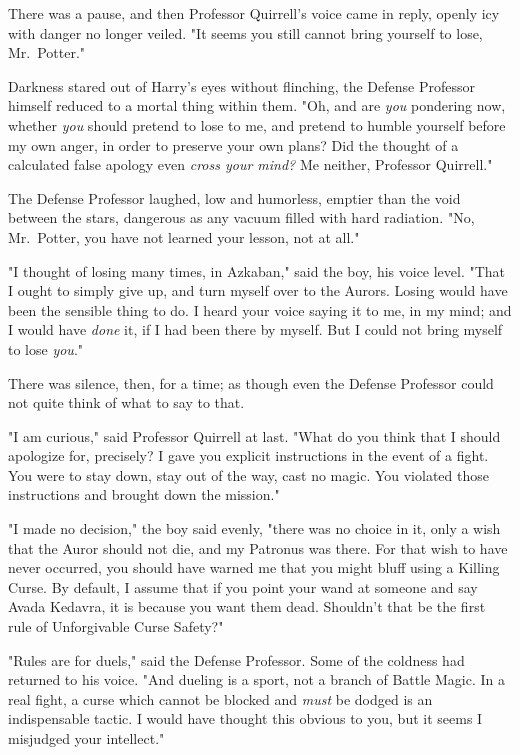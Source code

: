 There was a pause, and then Professor Quirrell's voice came in reply, openly 
icy with danger no longer veiled. "It seems you still cannot bring yourself to 
lose, Mr.~Potter."

Darkness stared out of Harry's eyes without flinching, the Defense Professor 
himself reduced to a mortal thing within them. "Oh, and are \emph{you} 
pondering now, whether \emph{you} should pretend to lose to me, and pretend to 
humble yourself before my own anger, in order to preserve your own plans? Did 
the thought of a calculated false apology even \emph{cross your mind?} Me 
neither, Professor Quirrell."

The Defense Professor laughed, low and humorless, emptier than the void between 
the stars, dangerous as any vacuum filled with hard radiation. "No, Mr.~Potter, 
you have not learned your lesson, not at all."

"I thought of losing many times, in Azkaban," said the boy, his voice level. 
"That I ought to simply give up, and turn myself over to the Aurors. Losing 
would have been the sensible thing to do. I heard your voice saying it to me, 
in my mind; and I would have \emph{done} it, if I had been there by myself. But 
I could not bring myself to lose \emph{you}."

There was silence, then, for a time; as though even the Defense Professor could 
not quite think of what to say to that.

"I am curious," said Professor Quirrell at last. "What do you think that I 
should apologize for, precisely? I gave you explicit instructions in the event 
of a fight. You were to stay down, stay out of the way, cast no magic. You 
violated those instructions and brought down the mission."

"I made no decision," the boy said evenly, "there was no choice in it, only a 
wish that the Auror should not die, and my Patronus was there. For that wish to 
have never occurred, you should have warned me that you might bluff using a 
Killing Curse. By default, I assume that if you point your wand at someone and 
say Avada Kedavra, it is because you want them dead. Shouldn't that be the 
first rule of Unforgivable Curse Safety?"

"Rules are for duels," said the Defense Professor. Some of the coldness had 
returned to his voice. "And dueling is a sport, not a branch of Battle Magic. 
In a real fight, a curse which cannot be blocked and \emph{must} be dodged is 
an indispensable tactic. I would have thought this obvious to you, but it seems 
I misjudged your intellect."


